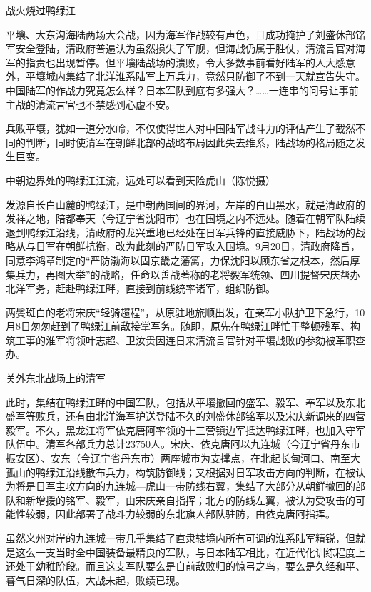 \documentclass[12pt,UTF8]{ctexbook}
\begin{document}
战火烧过鸭绿江

平壤、大东沟海陆两场大会战，因为海军作战较有声色，且成功掩护了刘盛休部铭军安全登陆，清政府普遍认为虽然损失了军舰，但海战仍属于胜仗，清流言官对海军的指责也出现暂停。但平壤陆战场的溃败，令大多数事前看好陆军的人大感意外，平壤城内集结了北洋淮系陆军上万兵力，竟然只防御了不到一天就宣告失守。中国陆军的作战力究竟怎么样？日本军队到底有多强大？……一连串的问号让事前主战的清流言官也不禁感到心虚不安。

兵败平壤，犹如一道分水岭，不仅使得世人对中国陆军战斗力的评估产生了截然不同的判断，同时使清军在朝鲜北部的战略布局因此失去维系，陆战场的格局随之发生巨变。


中朝边界处的鸭绿江江流，远处可以看到天险虎山（陈悦摄）

发源自长白山麓的鸭绿江，是中朝两国间的界河，左岸的白山黑水，就是清政府的发祥之地，陪都奉天（今辽宁省沈阳市）也在国境之内不远处。随着在朝军队陆续退到鸭绿江沿线，清政府的龙兴重地已经处在日军兵锋的直接威胁下，陆战场的战略从与日军在朝鲜抗衡，改为此刻的严防日军攻入国境。9月20日，清政府降旨，同意李鸿章制定的“严防渤海以固京畿之藩篱，力保沈阳以顾东省之根本，然后厚集兵力，再图大举”的战略，任命以善战著称的老将毅军统领、四川提督宋庆帮办北洋军务，赶赴鸭绿江畔，直接到前线统率诸军，组织防御。

两鬓斑白的老将宋庆“轻骑趱程”，从原驻地旅顺出发，在亲军小队护卫下急行，10月8日匆匆赶到了鸭绿江前敌接掌军务。随即，原先在鸭绿江畔忙于整顿残军、构筑工事的淮军将领叶志超、卫汝贵因连日来清流言官针对平壤战败的参劾被革职查办。


关外东北战场上的清军

此时，集结在鸭绿江畔的中国军队，包括从平壤撤回的盛军、毅军、奉军以及东北盛军等败兵，还有由北洋海军护送登陆不久的刘盛休部铭军以及宋庆新调来的四营毅军。不久，黑龙江将军依克唐阿率领的十三营镇边军抵达鸭绿江畔，也加入守军队伍中。清军各部兵力总计23750人。宋庆、依克唐阿以九连城（今辽宁省丹东市振安区）、安东（今辽宁省丹东市）两座城市为支撑点，在北起长甸河口、南至大孤山的鸭绿江沿线散布兵力，构筑防御线；又根据对日军攻击方向的判断，在被认为将是日军主攻方向的九连城—虎山一带防线右翼，集结了大部分从朝鲜撤回的部队和新增援的铭军、毅军，由宋庆亲自指挥；北方的防线左翼，被认为受攻击的可能性较弱，因此部署了战斗力较弱的东北旗人部队驻防，由依克唐阿指挥。

虽然义州对岸的九连城一带几乎集结了直隶辖境内所有可调的淮系陆军精锐，但就是这么一支当时全中国装备最精良的军队，与日本陆军相比，在近代化训练程度上还处于幼稚阶段。而且这支军队要么是自前敌败归的惊弓之鸟，要么是久经和平、暮气日深的队伍，大战未起，败绩已现。
\end{document}
